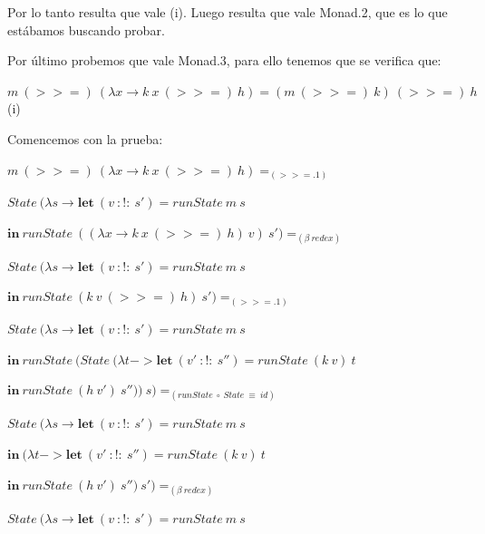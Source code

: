 \begin{flushleft}
Por lo tanto resulta que vale (i). Luego resulta que vale Monad.2, que es lo que estábamos buscando probar.\emptyline

Por último probemos que vale Monad.3, para ello tenemos que se verifica que:

  \begin{center}
    $m\ (>>=)\ (\lambda x \rightarrow k\ x\ (>>=)\ h) = (m\ (>>=)\ k)\ (>>=)\ h$ (i)
  \end{center}

Comencemos con la prueba:\emptyline

  \hspace{5mm} $m\ (>>=)\ (\lambda x\rightarrow k\ x\ (>>=)\ h) =_{(>>=.1)}$

  \hspace{5mm} $State\ (\lambda s \rightarrow \textbf{let}\ (v\ :!:\ s') = runState\ m\ s$
  
    \hspace{25.5mm} $\textbf{in}\ runState\ ((\lambda x \rightarrow k\ x\ (>>=)\ h)\ v)\ s') =_{(\beta\ redex)}$


  \hspace{5mm} $State\ (\lambda s \rightarrow \textbf{let}\ (v\ :!:\ s') = runState\ m\ s$
  
    \hspace{25.5mm} $\textbf{in}\ runState\ (k\ v\ (>>=)\ h)\ s') =_{(>>=.1)}$


  \hspace{5mm} $State\ (\lambda s \rightarrow \textbf{let}\ (v\ :!:\ s') = runState\ m\ s$
  
    \hspace{25.5mm} $\textbf{in}\ runState\ (State\ (\lambda t -> \textbf{let}\ (v'\ :!:\ s'') = runState\ (k\ v)\ t$
    
      \hspace{68.5mm} $\textbf{in}\ runState\ (h\ v')\ s''))\ s)=_{(runState\ \circ\ State\ \equiv\ id)}$


  \hspace{5mm} $State\ (\lambda s \rightarrow \textbf{let}\ (v\ :!:\ s') = runState\ m\ s$
  
    \hspace{25.5mm} $\textbf{in}\ (\lambda t -> \textbf{let}\ (v'\ :!:\ s'') = runState\ (k\ v)\ t$
    
      \hspace{42.5mm} $\textbf{in}\ runState\ (h\ v')\ s'')\ s')=_{(\beta\ redex)}$


  \hspace{5mm} $State\ (\lambda s \rightarrow \textbf{let}\ (v\ :!:\ s') = runState\ m\ s$
  

\end{flushleft}
